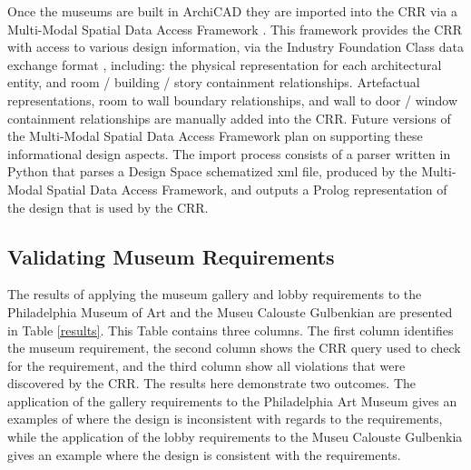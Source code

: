 \documentclass[12pt]{ucthesis}
\begin{document}
Once the museums are built in ArchiCAD they are imported into the CRR via a Multi-Modal Spatial Data Access Framework \cite{carl}. This framework provides the CRR with access to various design information, via the Industry Foundation Class data exchange format \cite{IFC}, including: the physical representation for each architectural entity, and room / building / story containment relationships. Artefactual representations, room to wall boundary relationships, and wall to door / window containment relationships are manually added into the CRR. Future versions of the Multi-Modal Spatial Data Access Framework plan on supporting these informational design aspects. The import process consists of a parser written in Python that parses a Design Space schematized xml file, produced by the Multi-Modal Spatial Data Access Framework, and outputs a Prolog representation of the design that is used by the CRR.


\subsection{Validating Museum Requirements}
The results of applying the museum gallery and lobby requirements to the Philadelphia Museum of Art and the Museu Calouste Gulbenkian are presented in Table \ref{results}. This Table contains three columns. The first column identifies the museum requirement, the second column shows the CRR query used to check for the requirement, and the third column show all violations that were discovered by the CRR. The results here demonstrate two outcomes. The application of the gallery requirements to the Philadelphia Art Museum gives an examples of where the design is inconsistent with regards to the requirements, while the application of the lobby requirements to the Museu Calouste Gulbenkia gives an example where the design is consistent with the requirements. 
\end{document}
